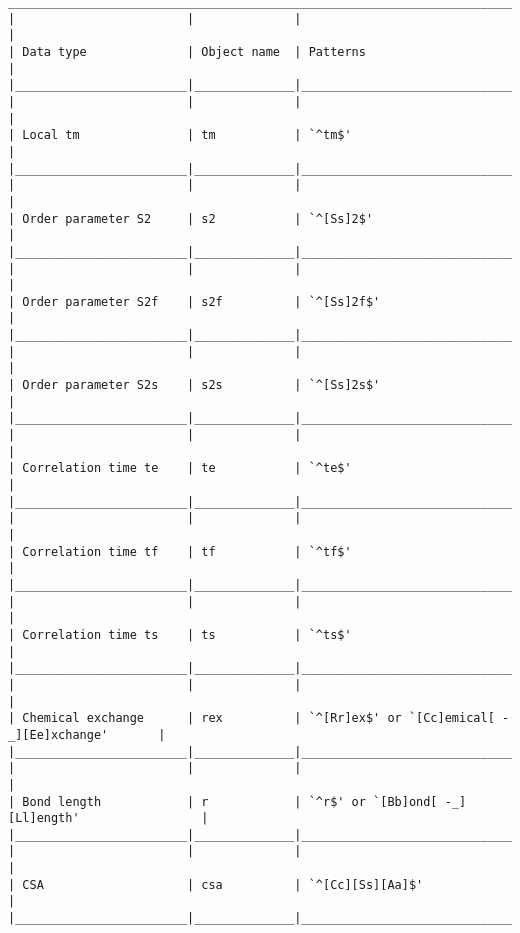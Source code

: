 {\begin{verbatim}
____________________________________________________________________________________________
|                        |              |                                                  |
| Data type              | Object name  | Patterns                                         |
|________________________|______________|__________________________________________________|
|                        |              |                                                  |
| Local tm               | tm           | `^tm$'                                           |
|________________________|______________|__________________________________________________|
|                        |              |                                                  |
| Order parameter S2     | s2           | `^[Ss]2$'                                        |
|________________________|______________|__________________________________________________|
|                        |              |                                                  |
| Order parameter S2f    | s2f          | `^[Ss]2f$'                                       |
|________________________|______________|__________________________________________________|
|                        |              |                                                  |
| Order parameter S2s    | s2s          | `^[Ss]2s$'                                       |
|________________________|______________|__________________________________________________|
|                        |              |                                                  |
| Correlation time te    | te           | `^te$'                                           |
|________________________|______________|__________________________________________________|
|                        |              |                                                  |
| Correlation time tf    | tf           | `^tf$'                                           |
|________________________|______________|__________________________________________________|
|                        |              |                                                  |
| Correlation time ts    | ts           | `^ts$'                                           |
|________________________|______________|__________________________________________________|
|                        |              |                                                  |
| Chemical exchange      | rex          | `^[Rr]ex$' or `[Cc]emical[ -_][Ee]xchange'       |
|________________________|______________|__________________________________________________|
|                        |              |                                                  |
| Bond length            | r            | `^r$' or `[Bb]ond[ -_][Ll]ength'                 |
|________________________|______________|__________________________________________________|
|                        |              |                                                  |
| CSA                    | csa          | `^[Cc][Ss][Aa]$'                                 |
|________________________|______________|__________________________________________________|




\end{verbatim}}
